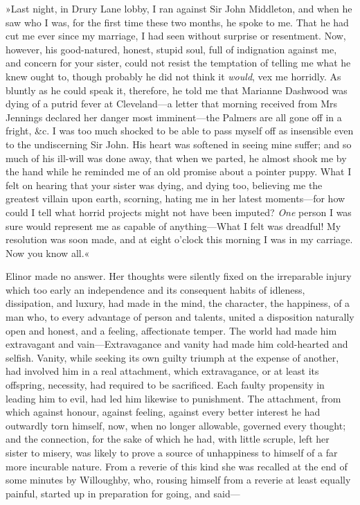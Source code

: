 »Last night, in Drury Lane lobby, I ran against Sir John Middleton, and when he saw who I was, for the first time these two months, he spoke to me. That he had cut me ever since my marriage, I had seen without surprise or resentment. Now, however, his good-natured, honest, stupid soul, full of indignation against me, and concern for your sister, could not resist the temptation of telling me what he knew ought to, though probably he did not think it \textit{would}, vex me horridly. As bluntly as he could speak it, therefore, he told me that Marianne Dashwood was dying of a putrid fever at Cleveland—a letter that morning received from Mrs Jennings declared her danger most imminent—the Palmers are all gone off in a fright, \&c. I was too much shocked to be able to pass myself off as insensible even to the undiscerning Sir John. His heart was softened in seeing mine suffer; and so much of his ill-will was done away, that when we parted, he almost shook me by the hand while he reminded me of an old promise about a pointer puppy. What I felt on hearing that your sister was dying, and dying too, believing me the greatest villain upon earth, scorning, hating me in her latest moments—for how could I tell what horrid projects might not have been imputed? \textit{One} person I was sure would represent me as capable of anything—What I felt was dreadful! My resolution was soon made, and at eight o’clock this morning I was in my carriage. Now you know all.«

Elinor made no answer. Her thoughts were silently fixed on the irreparable injury which too early an independence and its consequent habits of idleness, dissipation, and luxury, had made in the mind, the character, the happiness, of a man who, to every advantage of person and talents, united a disposition naturally open and honest, and a feeling, affectionate temper. The world had made him extravagant and vain—Extravagance and vanity had made him cold-hearted and selfish. Vanity, while seeking its own guilty triumph at the expense of another, had involved him in a real attachment, which extravagance, or at least its offspring, necessity, had required to be sacrificed. Each faulty propensity in leading him to evil, had led him likewise to punishment. The attachment, from which against honour, against feeling, against every better interest he had outwardly torn himself, now, when no longer allowable, governed every thought; and the connection, for the sake of which he had, with little scruple, left her sister to misery, was likely to prove a source of unhappiness to himself of a far more incurable nature. From a reverie of this kind she was recalled at the end of some minutes by Willoughby, who, rousing himself from a reverie at least equally painful, started up in preparation for going, and said—


